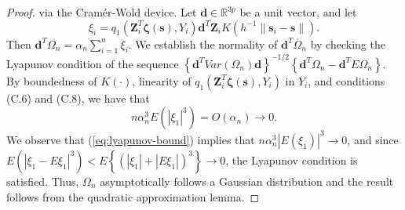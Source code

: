 \documentclass[authoryear,review, 12pt]{elsarticle}
\begin{document}
\begin{proof}
via the Cram\'{e}r-Wold device. Let $\bm{d}\in\mathbb{R}^{3p}$ be
a unit vector, and let
\[
\xi_{i}=q_{1}\left(\bm{Z}_{i}^{T}\bm{\zeta}(\bm{s}),Y_{i}\right)\bm{d}^{T}\bm{Z}_{i}K\left(h^{-1}\|\bm{s}_{i}-\bm{s}\|\right).
\]
Then $\bm{d}^{T}\Omega_{n}=\alpha_{n}\sum_{i=1}^{n}\xi_{i}$. We establish
the normality of $\bm{d}^{T}\Omega_{n}$ by checking the Lyapunov
condition of the sequence $\left\{ \bm{d}^{T}Var\left(\Omega_{n}\right)\bm{d}\right\} ^{-1/2}\left\{ \bm{d}^{T}\Omega_{n}-\bm{d}^{T}E\Omega_{n}\right\} $.
By boundedness of $K\left(\cdot\right)$, linearity of $q_{1}\left(\bm{Z}_{i}^{T}\bm{\zeta}(\bm{s}),Y_{i}\right)$
in $Y_{i}$, and conditions (C.6) and (C.8), we have that
\begin{equation}
n\alpha_{n}^{3}E\left(\left|\xi_{1}\right|^{3}\right)=O\left(\alpha_{n}\right)\to0.\label{eq:lyapunov-bound}
\end{equation}
We observe that (\ref{eq:lyapunov-bound}) implies that $n\alpha_{n}^{3}\left|E\left(\xi_{1}\right)\right|^{3}\to0$,
and since $E\left(\left|\xi_{1}-E\xi_{1}\right|^{3}\right)<E\left\{ \left(\left|\xi_{1}\right|+\left|E\xi_{1}\right|\right)^{3}\right\} \to0$,
the Lyapunov condition is satisfied. Thus, $\Omega_{n}$ asymptotically
follows a Gaussian distribution and the result follows from the quadratic
approximation lemma.
\end{proof}
\end{document}
